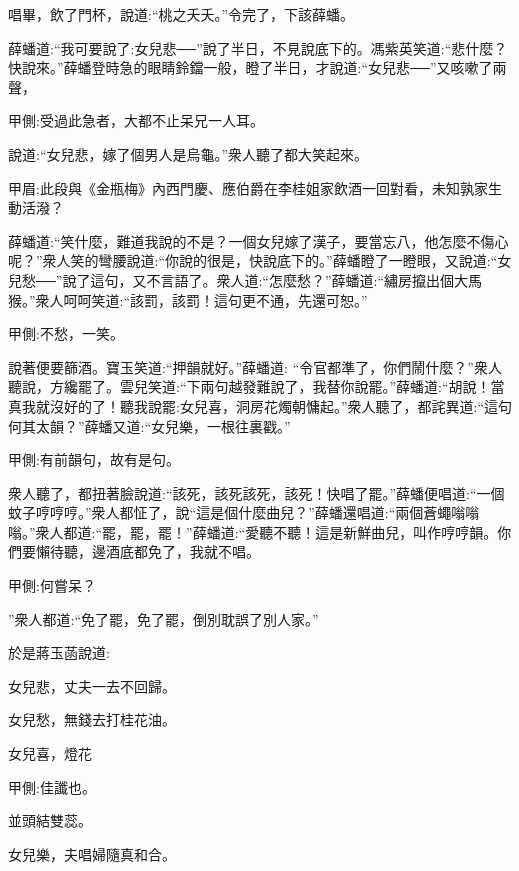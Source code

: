 \begin{parag}
    唱畢，飲了門杯，說道:“桃之夭夭。”令完了，下該薛蟠。
\end{parag}


\begin{parag}
    薛蟠道:“我可要說了:女兒悲──”說了半日，不見說底下的。馮紫英笑道:“悲什麼？快說來。”薛蟠登時急的眼睛鈴鐺一般，瞪了半日，才說道:“女兒悲──”又咳嗽了兩聲，\begin{note}甲側:受過此急者，大都不止呆兄一人耳。\end{note}說道:“女兒悲，嫁了個男人是烏龜。”衆人聽了都大笑起來。\begin{note}甲眉:此段與《金瓶梅》內西門慶、應伯爵在李桂姐家飲酒一回對看，未知孰家生動活潑？\end{note}薛蟠道:“笑什麼，難道我說的不是？一個女兒嫁了漢子，要當忘八，他怎麼不傷心呢？”衆人笑的彎腰說道:“你說的很是，快說底下的。”薛蟠瞪了一瞪眼，又說道:“女兒愁──”說了這句，又不言語了。衆人道:“怎麼愁？”薛蟠道:“繡房攛出個大馬猴。”衆人呵呵笑道:“該罰，該罰！這句更不通，先還可恕。”\begin{note}甲側:不愁，一笑。\end{note}說著便要篩酒。寶玉笑道:“押韻就好。”薛蟠道: “令官都準了，你們鬧什麼？”衆人聽說，方纔罷了。雲兒笑道:“下兩句越發難說了，我替你說罷。”薛蟠道:“胡說！當真我就沒好的了！聽我說罷:女兒喜，洞房花燭朝慵起。”衆人聽了，都詫異道:“這句何其太韻？”薛蟠又道:“女兒樂，一根往裏戳。”\begin{note}甲側:有前韻句，故有是句。\end{note}衆人聽了，都扭著臉說道:“該死，該死該死，該死！快唱了罷。”薛蟠便唱道:“一個蚊子哼哼哼。”衆人都怔了，說“這是個什麼曲兒？”薛蟠還唱道:“兩個蒼蠅嗡嗡嗡。”衆人都道:“罷，罷，罷！”薛蟠道:“愛聽不聽！這是新鮮曲兒，叫作哼哼韻。你們要懶待聽，邊酒底都免了，我就不唱。\begin{note}甲側:何嘗呆？\end{note}”衆人都道:“免了罷，免了罷，倒別耽誤了別人家。”
\end{parag}


\begin{parag}
    於是蔣玉菡說道:
\end{parag}


\begin{poem}
    \begin{pl}女兒悲，丈夫一去不回歸。\end{pl}

    \begin{pl}女兒愁，無錢去打桂花油。\end{pl}

    \begin{pl}女兒喜，燈花\end{pl}\begin{note}甲側:佳讖也。\end{note}\begin{pl}並頭結雙蕊。\end{pl}

    \begin{pl}女兒樂，夫唱婦隨真和合。\end{pl}

\end{poem}



